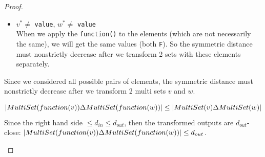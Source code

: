 \documentclass[11pt,a4paper]{article}
\newcommand{\silvia}[1]{{ {\color{blue}{(silvia)~#1}}}}
\newcommand{\grace}[1]{{ {\color{purple}{(grace)~#1}}}}
\begin{document}
\begin{proof}
\begin{enumerate}
\begin{itemize}
    \item $v^* \neq $ \texttt{value}, $w^* \neq $ \texttt{value} \\
    When we apply the \texttt{function()} to the elements (which are not necessarily the same), we will get the same values (both \texttt{F}). So the symmetric distance must nonstrictly decrease after we transform 2 sets with these elements separately.
    
\end{itemize}

Since we considered all possible pairs of elements, the symmetric distance must nonstrictly decrease after we transform 2 multi sets $v$ and $w$. 

$$\abs{MultiSet(function(v)) \Delta MultiSet(function(w))} \leq \abs{MultiSet(v) \Delta MultiSet(w)}$$ Since the right hand side $\leq d_{in} \leq d_{out}$, then the transformed outputs are $d_{out}$-close: $\abs{MultiSet(function(v)) \Delta MultiSet(function(w))} \leq d_{out}$.

\end{enumerate}
\end{proof}

\silvia{I think you are using the histogram notation implicitly because I don't think you can say something like $function(v) = T$ (for true) because it is a vector/set, and you mean to say one entry, right? } \grace{Not super sure - it's just function applied to a singular element $v$ but that's not a vector of size 1.} \silvia{Ah then it is the map we discussed today}
\end{document}
